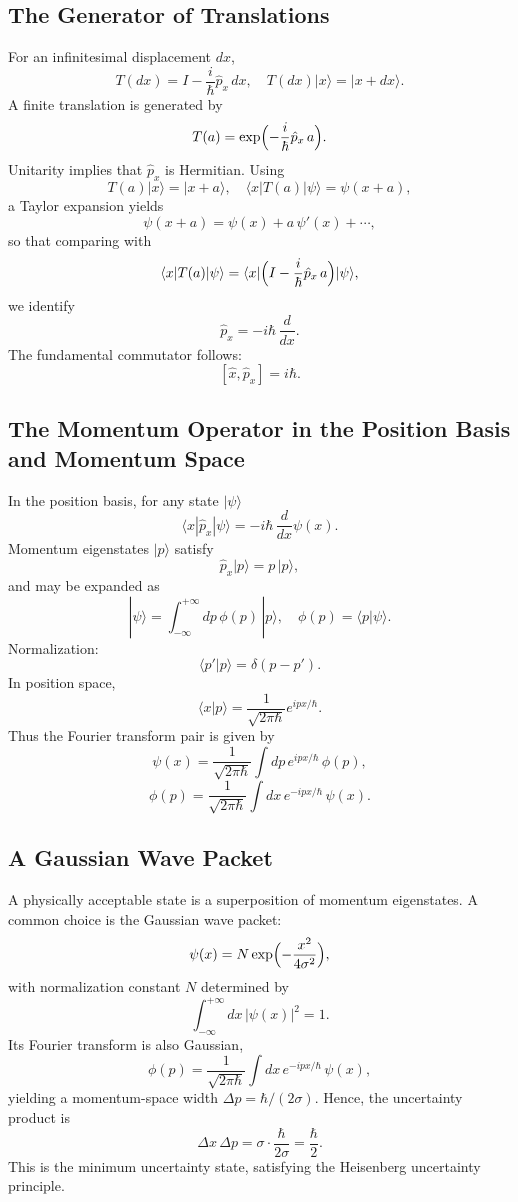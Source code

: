 \documentclass[twocolumn]{article}
\begin{document}
\begin{spacing}{1}
\subsection{The Generator of Translations}
For an infinitesimal displacement \(dx\),
\[
T(dx)=I-\frac{i}{\hbar}\hat{p}_x\,dx,\quad T(dx)|x\rangle=|x+dx\rangle.
\]
A finite translation is generated by
\[
T(a)=\exp\Bigl(-\frac{i}{\hbar}\hat{p}_x\,a\Bigr).
\]
Unitarity implies that \(\hat{p}_x\) is Hermitian. Using
\[
T(a)|x\rangle=|x+a\rangle,\quad \langle x|T(a)|\psi\rangle=\psi(x+a),
\]
a Taylor expansion yields
\[
\psi(x+a)=\psi(x)+a\,\psi'(x)+\cdots,
\]
so that comparing with
\[
\langle x|T(a)|\psi\rangle=\langle x|\Bigl(I-\frac{i}{\hbar}\hat{p}_x\,a\Bigr)|\psi\rangle,
\]
we identify
\[
\hat{p}_x = -i\hbar\,\frac{d}{dx}.
\]
The fundamental commutator follows:
\[
[\hat{x},\hat{p}_x]=i\hbar.
\]

\subsection{The Momentum Operator in the Position Basis and Momentum Space}
In the position basis, for any state \(|\psi\rangle\)
\[
\langle x|\hat{p}_x|\psi\rangle = -i\hbar\,\frac{d}{dx}\psi(x).
\]
Momentum eigenstates \(|p\rangle\) satisfy
\[
\hat{p}_x|p\rangle = p\,|p\rangle,
\]
and may be expanded as
\[
|\psi\rangle = \int_{-\infty}^{+\infty}dp\,\phi(p)\,|p\rangle,\quad \phi(p)=\langle p|\psi\rangle.
\]
Normalization:
\[
\langle p'|p\rangle=\delta(p-p').
\]
In position space,
\[
\langle x|p\rangle = \frac{1}{\sqrt{2\pi\hbar}}e^{ipx/\hbar}.
\]
Thus the Fourier transform pair is given by
\[
\psi(x)=\frac{1}{\sqrt{2\pi\hbar}}\int dp\,e^{ipx/\hbar}\,\phi(p),
\]
\[
\phi(p)=\frac{1}{\sqrt{2\pi\hbar}}\int dx\,e^{-ipx/\hbar}\,\psi(x).
\]

\subsection{A Gaussian Wave Packet}
A physically acceptable state is a superposition of momentum eigenstates. A common choice is the Gaussian wave packet:
\[
\psi(x)=N\exp\Bigl(-\frac{x^2}{4\sigma^2}\Bigr),
\]
with normalization constant \(N\) determined by
\[
\int_{-\infty}^{+\infty}dx\,|\psi(x)|^2=1.
\]
Its Fourier transform is also Gaussian,
\[
\phi(p)=\frac{1}{\sqrt{2\pi\hbar}}\int dx\,e^{-ipx/\hbar}\,\psi(x),
\]
yielding a momentum-space width \(\Delta p=\hbar/(2\sigma)\). Hence, the uncertainty product is
\[
\Delta x\,\Delta p = \sigma\cdot\frac{\hbar}{2\sigma}=\frac{\hbar}{2}.
\]
This is the minimum uncertainty state, satisfying the Heisenberg uncertainty principle.


\end{spacing}
\end{document}
